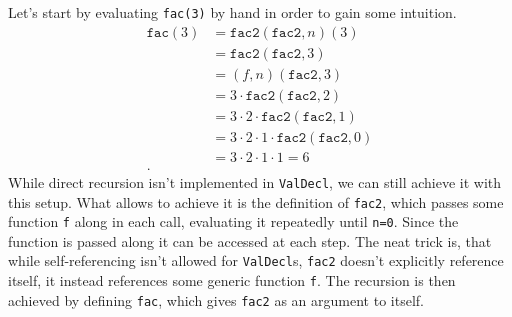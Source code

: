 \documentclass[working, oneside]{../../../../Preambles/tuftebook}
\begin{document}
Let's start by evaluating \texttt{fac(3)} by hand in order to gain some intuition.
\begin{align*}
    \texttt{fac}\left( 3 \right) &= \texttt{fac2}\left( \texttt{fac2}, n \right) \left( 3 \right)  \\
    &= \texttt{fac2}\left( \texttt{fac2}, 3 \right)  \\
    &= \left( f, n \right) \left( \texttt{fac2}, 3 \right)  \\
    &= 3 \cdot \texttt{fac2}\left( \texttt{fac2}, 2 \right)  \\
    &= 3\cdot 2\cdot \texttt{fac2}\left( \texttt{fac2},1 \right)  \\
    &= 3\cdot 2\cdot 1 \cdot \texttt{fac2}\left( \texttt{fac2},0 \right)  \\
    &= 3\cdot 2\cdot 1\cdot 1 = 6 \\
.\end{align*}
While direct recursion isn't implemented in \texttt{ValDecl}, we can still achieve it with this setup. What allows to achieve it is the definition of \texttt{fac2}, which passes some function \texttt{f} along in each call, evaluating it repeatedly until \texttt{n=0}. Since the function is passed along it can be accessed at each step. The neat trick is, that while self-referencing isn't allowed for \texttt{ValDecl}s, \texttt{fac2} doesn't explicitly reference itself, it instead references some generic function \texttt{f}. The recursion is then achieved by defining \texttt{fac}, which gives  \texttt{fac2} as an argument to itself.
\end{document}
